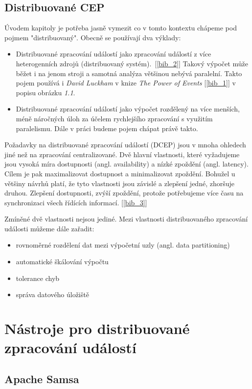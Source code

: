 \documentclass[
  digital, %
  table,   %
  nolof,     %
  nolot,     %
  twoside, %
  nocover,
  monochrome,
  12pt
]{fithesis3}
\begin{document}
\section{Distribuované CEP}
Úvodem kapitoly je potřeba jasně vymezit co v tomto kontextu chápeme pod pojmem "distribuovaný". Obecně se používají dva výklady:
\begin{itemize}
  \item Distribuované zpracování událostí jako zpracování událostí z více heterogenních zdrojů (distribuovaný systém).~[\ref{bib_2}] Takový výpočet může běžet i na jenom stroji a samotná analýza většinou nebývá paralelní. Takto pojem používá i \textit{David Luckham} v knize \textit{The Power of Events} [\ref{bib_1}] v popisu obrázku \textit{1.1}.
  \item Distribuované zpracování událostí jako výpočet rozdělený na více menších, méně náročných úloh za účelem rychlejšího zpracování s využitím paralelismu. Dále v práci budeme pojem chápat právě takto.
\end{itemize}

Požadavky na distribuované zpracování událostí (DCEP) jsou v mnoha ohledech jiné než na zpracování centralizované. Dvě hlavní vlastnosti, které vyžadujeme jsou vysoká míra dostupnosti (angl. availability) a nízké zpoždění (angl. latency). Cílem je pak maximalizovat dostupnost a minimalizovat zpoždění. Bohužel u většiny návrhů platí, že tyto vlastnosti jsou závislé a zlepšení jedné, zhoršuje druhou. Zlepšení dostupnosti, zvýší zpoždění, protože potřebujeme více času na synchronizaci všech řídících informací. [\ref{bib_3}]

Zmíněné dvě vlastnosti nejsou jediné. Mezi vlastnosti distribuovaného zpracování události můžeme dále zařadit:
\begin{itemize}
  \item rovnoměrné rozdělení dat mezi výpočetní uzly (angl. data partitioning)
  \item automatické škálování výpočtu
  \item tolerance chyb
  \item správa datového úložiště
\end{itemize}

\chapter{Nástroje pro distribuované zpracování událostí}
\section{Apache Samsa}
\end{document}
